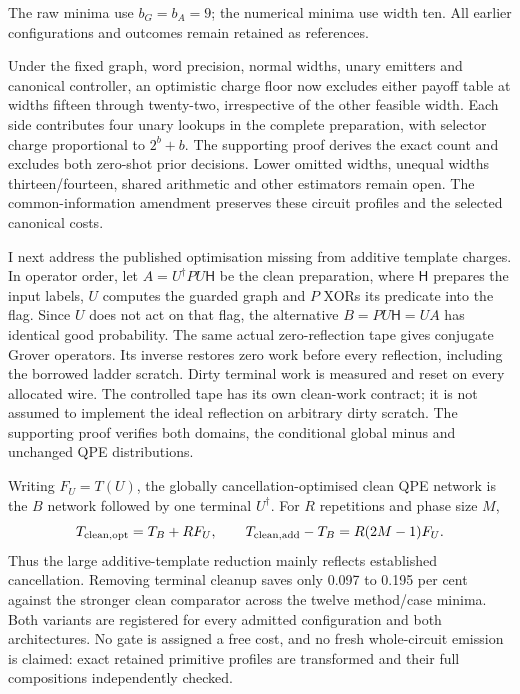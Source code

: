 \documentclass[11pt]{article}
\begin{document}
The raw minima use $b_G=b_A=9$; the numerical minima use width ten.
All earlier configurations and outcomes remain retained as references.

Under the fixed graph, word precision, normal widths, unary emitters and
canonical controller, an optimistic charge floor now excludes either
payoff table at widths fifteen through twenty-two, irrespective of the
other feasible width. Each side contributes four unary lookups in the
complete preparation, with selector charge proportional to $2^b+b$.
The supporting proof derives the exact count and excludes both zero-shot
prior decisions. Lower omitted widths, unequal widths thirteen/fourteen,
shared arithmetic and other estimators remain open. The common-information
amendment preserves these circuit profiles and the selected canonical costs.

I next address the published optimisation missing from additive template
charges. In operator order, let
$A=U^\dagger P U\mathsf H$ be the clean preparation, where $\mathsf H$
prepares the input labels, $U$ computes the guarded graph and $P$ XORs
its predicate into the flag. Since $U$ does not act on that flag,
the alternative $B=P U\mathsf H=UA$ has identical good probability.
The same actual zero-reflection tape gives conjugate Grover operators.
Its inverse restores zero work before every reflection, including the
borrowed ladder scratch. Dirty terminal work is measured and reset on
every allocated wire. The controlled tape has its own clean-work
contract; it is not assumed to implement the ideal reflection on
arbitrary dirty scratch. The supporting proof verifies both domains,
the conditional global minus and unchanged QPE distributions.

Writing $F_U=T(U)$, the globally cancellation-optimised clean QPE network
is the $B$ network followed by one terminal $U^\dagger$. For $R$ repetitions
and phase size $M$,
\begin{equation}
T_{\rm clean,opt}=T_B+RF_U,\qquad
T_{\rm clean,add}-T_B=R(2M-1)F_U.
\label{eq:cleanup-aware-complete-comparison}
\end{equation}
Thus the large additive-template reduction mainly reflects established
cancellation. Removing terminal cleanup saves only 0.097 to 0.195 per cent
against the stronger clean comparator across the twelve method/case minima.
Both variants are registered for every admitted configuration and both
architectures. No gate is assigned a free cost, and no fresh whole-circuit
emission is claimed: exact retained primitive profiles are transformed and
their full compositions independently checked.
\end{document}
